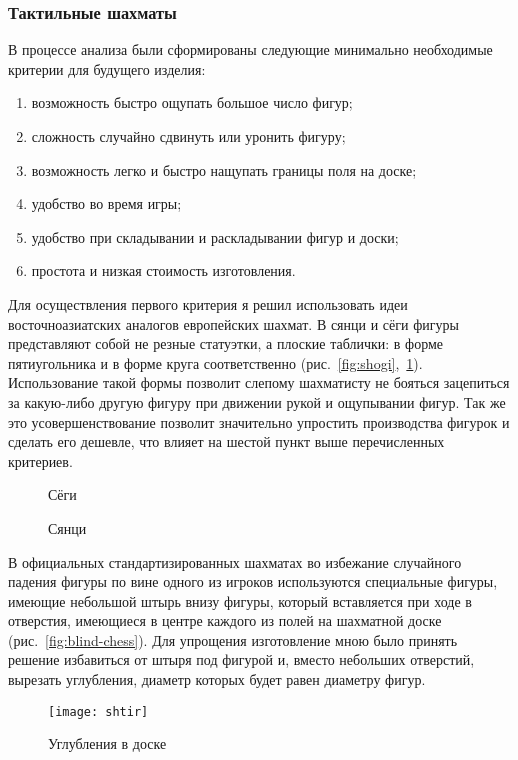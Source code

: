 \subsubsection{Тактильные шахматы}
В процессе анализа были сформированы следующие минимально необходимые критерии
для будущего изделия:
\begin{enumerate}
    \item возможность быстро ощупать большое число фигур;
    \item сложность случайно сдвинуть или уронить фигуру;
    \item возможность легко и быстро нащупать границы поля на доске;
    \item удобство во время игры;
    \item удобство при складывании и раскладывании фигур и доски;
    \item простота и низкая стоимость изготовления.
\end{enumerate}
Для осуществления первого критерия я решил использовать идеи восточноазиатских
аналогов европейских шахмат. В сянци и сёги фигуры представляют собой не резные
статуэтки, а плоские таблички: в форме пятиугольника и в форме круга
соответственно (рис.~\ref{fig:shogi},~\ref{fig:syanci}). Использование такой
формы позволит слепому шахматисту не бояться зацепиться за какую-либо другую
фигуру при движении рукой и ощупывании фигур. Так же это усовершенствование
позволит значительно упростить производства фигурок и сделать его дешевле, что
влияет на шестой пункт выше перечисленных критериев.
\begin{figure}[h]
    \begin{minipage}[h]{0.5\linewidth}
        \caption{Сёги}\label{fig:shogi}
    \end{minipage}
    \begin{minipage}[h]{0.5\linewidth}
        \caption{Сянци}\label{fig:syanci}
    \end{minipage}
\end{figure}

В официальных стандартизированных шахматах во избежание случайного падения
фигуры по вине одного из игроков используются специальные фигуры, имеющие
небольшой штырь внизу фигуры, который вставляется при ходе в отверстия,
имеющиеся в центре каждого из полей на шахматной доске
(рис.~\ref{fig:blind-chess}). Для упрощения изготовление мною было принять
решение избавиться от штыря под фигурой и, вместо небольших отверстий, вырезать
углубления, диаметр которых будет равен диаметру фигур.
\begin{figure}[h]
    \centering
    \texttt{[image: shtir]}
    \caption{Углубления в доске}\label{fig:shtir}
\end{figure}

